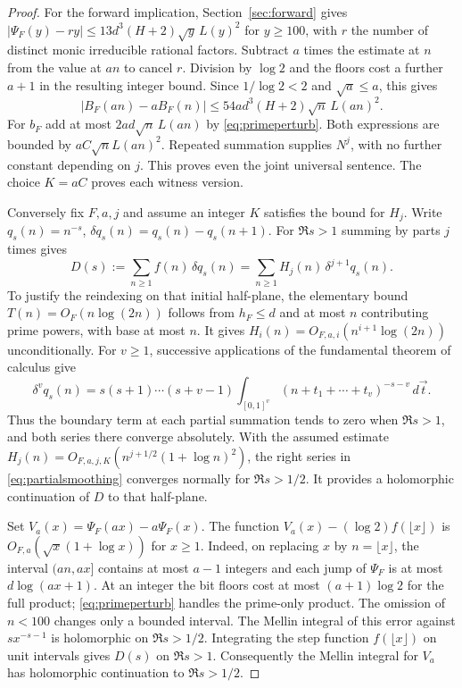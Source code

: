 \begin{proof}
For the forward implication, Section~\ref{sec:forward} gives
$|\Psi_F(y)-r y|\le13d^3(H+2)\sqrt y\,L(y)^2$ for $y\ge100$, with $r$ the number of distinct monic irreducible rational factors. Subtract $a$ times the estimate at $n$ from the value at $an$ to cancel $r$. Division by $\log 2$ and the floors cost a further $a+1$ in the resulting integer bound. Since $1/\log 2<2$ and $\sqrt a\le a$, this gives
\[
 |B_F(an)-aB_F(n)|\le54a d^3(H+2)\sqrt n\,L(an)^2 .
\]
For $b_F$ add at most $2ad\sqrt n\,L(an)$ by \eqref{eq:primeperturb}. Both expressions are bounded by $aC\sqrt n L(an)^2$. Repeated summation supplies $N^j$, with no further constant depending on $j$. This proves even the joint universal sentence. The choice $K=aC$ proves each witness version.

Conversely fix $F,a,j$ and assume an integer $K$ satisfies the bound for $H_j$. Write $q_s(n)=n^{-s}$, $\delta q_s(n)=q_s(n)-q_s(n+1)$. For $\Re s>1$ summing by parts $j$ times gives
\begin{equation}\label{eq:partialsmoothing}
 D(s):=\sum_{n\ge1} f(n)\,\delta q_s(n)
       =\sum_{n\ge1}H_j(n)\,\delta^{j+1}q_s(n).
\end{equation}
To justify the reindexing on that initial half-plane, the elementary bound $T(n)=O_F(n\log(2n))$ follows from $h_F\le d$ and at most $n$ contributing prime powers, with base at most $n$. It gives $H_i(n)=O_{F,a,i}(n^{i+1}\log(2n))$ unconditionally. For $v\ge1$, successive applications of the fundamental theorem of calculus give
\[
 \delta^v q_s(n)=s(s+1)\cdots(s+v-1)
 \int_{[0,1]^v}(n+t_1+\cdots+t_v)^{-s-v}\,d\vec t.
\]
Thus the boundary term at each partial summation tends to zero when $\Re s>1$, and both series there converge absolutely. With the assumed estimate $H_j(n)=O_{F,a,j,K}(n^{j+1/2}(1+\log n)^2)$, the right series in \eqref{eq:partialsmoothing} converges normally for $\Re s>1/2$. It provides a holomorphic continuation of $D$ to that half-plane.

Set $V_a(x)=\Psi_F(ax)-a\Psi_F(x)$. The function
$V_a(x)-(\log 2)f(\lfloor x\rfloor)$ is $O_{F,a}(\sqrt x(1+\log x))$ for $x\ge1$. Indeed, on replacing $x$ by $n=\lfloor x\rfloor$, the interval $(an,ax]$ contains at most $a-1$ integers and each jump of $\Psi_F$ is at most $d\log(ax+1)$. At an integer the bit floors cost at most $(a+1)\log 2$ for the full product; \eqref{eq:primeperturb} handles the prime-only product. The omission of $n<100$ changes only a bounded interval. The Mellin integral of this error against $s x^{-s-1}$ is holomorphic on $\Re s>1/2$. Integrating the step function $f(\lfloor x\rfloor)$ on unit intervals gives $D(s)$ on $\Re s>1$. Consequently the Mellin integral for $V_a$ has holomorphic continuation to $\Re s>1/2$.


\end{proof}
